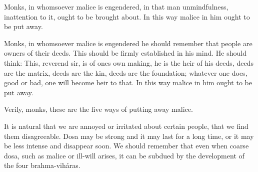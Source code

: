 \documentclass[12pt,twoside]{article}
\begin{document}
Monks, in whomsoever malice is engendered, in that man unmindfulness,
inattention to it, ought to be brought about. In this way malice in him
ought to be put away. 

Monks, in whomsoever malice is engendered he should remember that people
are owners of their deeds. This should be firmly established in his
mind. He should think: This, reverend sir, is of one{\textquotesingle}s
own making, he is the heir of his deeds, deeds are the matrix, deeds
are the kin, deeds are the foundation; whatever one does, good or bad,
one will become heir to that. In this way malice in him ought to be put
away. 

Verily, monks, these are the five ways of putting away malice. 


\bigskip

It is natural that we are annoyed or irritated about certain people,
that we find them disagreeable. Dosa may be strong and it may last for
a long time, or it may be less intense and disappear soon. We should
remember that even when coarse dosa, such as malice or ill{}-will
arises, it can be subdued by the development of the four
brahma{}-vih{\aa}ras. 
\end{document}
